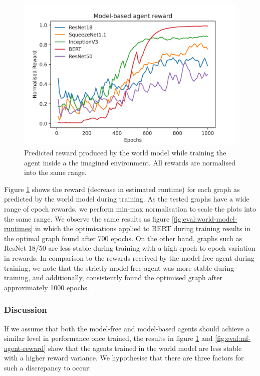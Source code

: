 
\begin{figure}[h]
  \centering
  \includegraphics[width=1\columnwidth]{sections/5evaluation/images/mb_ctrl_training_reward}
  \caption[Predicted epoch reward during training of agent in world model]{Predicted reward produced by the world model while training the agent inside a the imagined environment. All rewards are normalised into the same range.}
  \label{fig:eval:world-model-pred-reward}
\end{figure}

Figure \ref{fig:eval:world-model-pred-reward} shows the reward (decrease in estimated runtime) for each graph as predicted by the world model during training. As the tested graphs have a wide range of epoch rewards, we perform min-max normalisation to scale the plots into the same range. We observe the same results as figure \ref{fig:eval:world-model-runtimes} in which the optimisations applied to BERT during training results in the optimal graph found after 700 epochs. On the other hand, graphs such as ResNet 18/50 are less stable during training with a high epoch to epoch variation in rewards. In comparison to the rewards received by the model-free agent during training, we note that the strictly model-free agent was more stable during training, and additionally, consistently found the optimised graph after approximately 1000 epochs.

\subsubsection{Discussion}

If we assume that both the model-free and model-based agents should achieve a similar level in performance once trained, the results in figure \ref{fig:eval:world-model-pred-reward} and \ref{fig:eval:mf-agent-reward} show that the agents trained in the world model are less stable with a higher reward variance. We hypothesise that there are three factors for such a discrepancy to occur:

